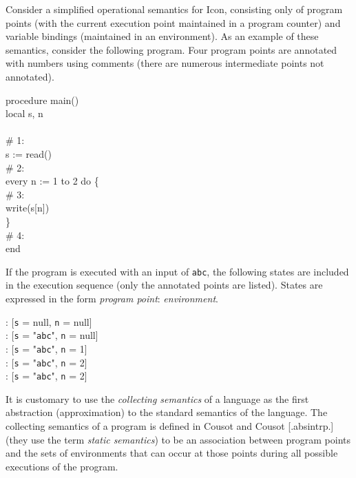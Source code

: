 Consider a simplified operational semantics for Icon, consisting only
of program points (with the current execution point maintained in a
program counter) and variable bindings (maintained in an
environment). As an example of these semantics, consider the following
program. Four program points are annotated with numbers using comments
(there are numerous intermediate points not annotated).

\goodbreak
\begin{iconcode}
procedure main()\\
local s, n\\
\\
\>\# 1:\\
\>s := read()\\
\>\# 2:\\
\>every n := 1 to 2 do \{\\
\>\>\# 3:\\
\>\>write(s[n])\\
\>\>\}\\
\>\# 4:\\
end\\
\end{iconcode}


If the program is executed with an input of \texttt{abc}, the following states
are included in the execution sequence (only the annotated points are
listed). States are expressed in the form \textit{program point}:
\textit{environment}.

\goodbreak
\begin{specialcode}{}
\>: [\texttt{s} = null, \texttt{n} = null]\\
\>: [\texttt{s} = "\texttt{abc}", \texttt{n} = null]\\
\>: [\texttt{s} = "\texttt{abc}", \texttt{n} = 1]\\
\>: [\texttt{s} = "\texttt{abc}", \texttt{n} = 2]\\
\>: [\texttt{s} = "\texttt{abc}", \texttt{n} = 2]\\
\end{specialcode}


It is customary to use the \textit{collecting semantics} of a language
as the first abstraction (approximation) to the standard semantics of
the language. The collecting semantics of a program is defined in
Cousot and Cousot [.absintrp.]  (they use the term \textit{static
semantics}) to be an association between program points and the sets
of environments that can occur at those points during all possible
executions of the program.

